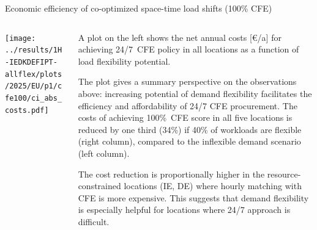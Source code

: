 \begin{frame}{Economic efficiency of co-optimized space-time load shifts (100\% CFE)}
\label{sec:efficiency}

  {\footnotesize
  \vspace{0.2cm}
  
  \begin{columns}
  \begin{column}{8cm}
  \centering
  \vspace{0.2cm}
  \texttt{[image: ../results/1H-IEDKDEFIPT-allflex/plots/2025/EU/p1/cfe100/ci\_abs\_costs.pdf]}
  \end{column}
  
  \begin{column}{7cm}
    A plot on the left shows the \alert{net annual costs [\euro/a]} for achieving 24/7~CFE policy in all locations as a function of load flexibility potential. 
    
    \vspace{0.1cm} 
    The plot gives a summary perspective on the observations above: increasing potential of demand flexibility facilitates the \alert{efficiency and affordability} of 24/7 CFE procurement. The costs of achieving 100\%~CFE score in all five locations is reduced by one third (34\%) if 40\% of workloads are flexible (right column), compared to the inflexible demand scenario (left column).

    \vspace{0.1cm} 
    The cost reduction is proportionally higher in the resource-constrained locations (IE, DE) where hourly matching with CFE is more expensive. This suggests that demand flexibility is especially helpful for locations \alert{where 24/7 approach is difficult}.

    \end{column}
  \end{columns}
  
  }
\end{frame}


